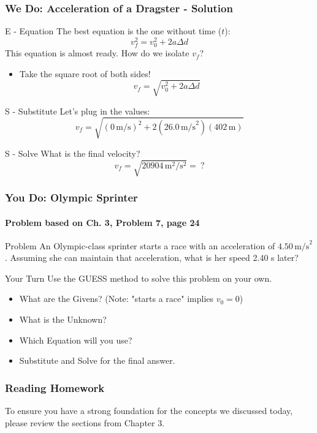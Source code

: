 \documentclass{beamer}
\begin{document}
\begin{frame}
\frametitle{We Do: Acceleration of a Dragster - Solution}
\begin{block}{E - Equation}
The best equation is the one without time ($t$):
\[ v_f^2 = v_0^2 + 2a\Delta d \]
\pause
This equation is almost ready. How do we isolate $v_f$?
\begin{itemize}
    \item \alert{Take the square root of both sides!}
    \[ v_f = \sqrt{v_0^2 + 2a\Delta d} \]
\end{itemize}
\end{block}
\pause
\begin{block}{S - Substitute}
Let's plug in the values:
\[ v_f = \sqrt{(0 \, \text{m/s})^2 + 2(26.0 \, \text{m/s}^2)(402 \, \text{m})} \]
\end{block}
\pause
\begin{block}{S - Solve}
What is the final velocity?
\[ v_f = \sqrt{20904 \, \text{m}^2/\text{s}^2} = \ ? \]
\pause
{}
\end{block}
\end{frame}

\begin{frame}
\frametitle{You Do: Olympic Sprinter}
\framesubtitle{Problem based on Ch. 3, Problem 7, page 24}
\begin{block}{Problem}
An Olympic-class sprinter starts a race with an acceleration of $4.50 \, \text{m/s}^2$. Assuming she can maintain that acceleration, what is her speed 2.40 s later?
\end{block}
\vfill
\begin{alertblock}{Your Turn}
Use the GUESS method to solve this problem on your own.
\begin{itemize}
    \item What are the Givens? (Note: "starts a race" implies $v_0 = 0$)
    \item What is the Unknown?
    \item Which Equation will you use?
    \item Substitute and Solve for the final answer.
\end{itemize}
\end{alertblock}
\end{frame}

\begin{frame}
\frametitle{Reading Homework}
To ensure you have a strong foundation for the concepts we discussed today, please review the sections from Chapter 3.
\end{frame}
\end{document}
